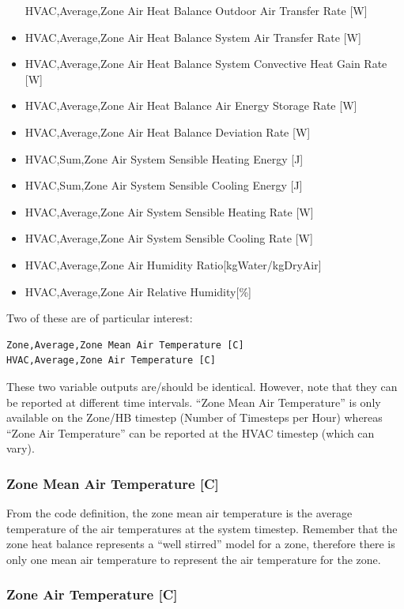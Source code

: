 \begin{itemize}
  HVAC,Average,Zone Air Heat Balance Outdoor Air Transfer Rate {[}W{]}
\item
  HVAC,Average,Zone Air Heat Balance System Air Transfer Rate {[}W{]}
\item
  HVAC,Average,Zone Air Heat Balance System Convective Heat Gain Rate {[}W{]}
\item
  HVAC,Average,Zone Air Heat Balance Air Energy Storage Rate {[}W{]}
\item
  HVAC,Average,Zone Air Heat Balance Deviation Rate {[}W{]}
\item
  HVAC,Sum,Zone Air System Sensible Heating Energy {[}J{]}
\item
  HVAC,Sum,Zone Air System Sensible Cooling Energy {[}J{]}
\item
  HVAC,Average,Zone Air System Sensible Heating Rate {[}W{]}
\item
  HVAC,Average,Zone Air System Sensible Cooling Rate {[}W{]}
\item
  HVAC,Average,Zone Air Humidity Ratio{[}kgWater/kgDryAir{]}
\item
  HVAC,Average,Zone Air Relative Humidity{[}\%{]}
\end{itemize}

Two of these are of particular interest:

\begin{lstlisting}
Zone,Average,Zone Mean Air Temperature [C]
HVAC,Average,Zone Air Temperature [C]
\end{lstlisting}

These two variable outputs are/should be identical. However, note that they can be reported at different time intervals. ``Zone Mean Air Temperature'' is only available on the Zone/HB timestep (Number of Timesteps per Hour) whereas ``Zone Air Temperature'' can be reported at the HVAC timestep (which can vary).

\subsubsection{Zone Mean Air Temperature {[}C{]}}\label{zone-mean-air-temperature-c}

From the code definition, the zone mean air temperature is the average temperature of the air temperatures at the system timestep. Remember that the zone heat balance represents a ``well stirred'' model for a zone, therefore there is only one mean air temperature to represent the air temperature for the zone.

\subsubsection{Zone Air Temperature {[}C{]}}\label{zone-air-temperature-c}

